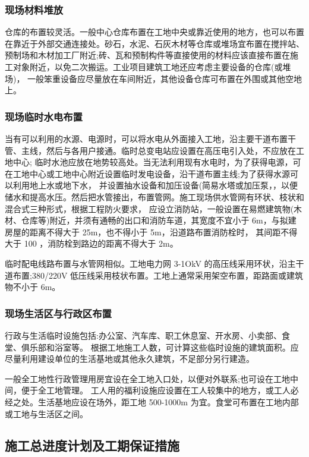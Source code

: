 \subsubsection{现场材料堆放}

仓库的布置较灵活。一般中心仓库布置在工地中央或靠近使用的地方，也可以布置在靠近于外部交通连接处。砂石，水泥、石灰木材等仓库或堆场宜布置在搅拌站、
预制场和木材加工厂附近;砖、瓦和预制构件等直接使用的材料应该直接布置在施工对象附近，以免二次搬运。工业项目建筑工地还应考虑主要设备的仓库(或堆场)，
一般笨重设备应尽量放在车间附近，其他设备仓库可布置在外围或其他空地上。

\subsubsection{现场临时水电布置}

当有可以利用的水源、电源时，可以将水电从外面接入工地，沿主要干道布置干管、主线，然后与各用户接通。临时总变电站应设置在高压电引入处，不应放在工地中心;
临时水池应放在地势较高处。当无法利用现有水电时，为了获得电源，可在工地中心或工地中心附近设置临时发电设备，沿干道布置主线;为了获得水源可以利用地上水或地下水，
并设置抽水设备和加压设备(简易水塔或加压泵，，以便储水和提高水压。然后把水管接出，布置管网。施工现场供水管网有环状、枝状和混合式三种形式，根据工程防火要求，
应设立消防站，一般设置在易燃建筑物(木材、仓库等)附近，并须有通畅的出口和消防车道，其宽度不宜小于 6m，与拟建房屋的距离不得大于 25m，也不得小于 5m，沿道路布置消防栓时，
其间距不得大于 100 ，消防栓到路边的距离不得大于 2m。

临时配电线路布置与水管网相似。工地电力网 3-1OkV 的高压线采用环状，沿主干道布置;380/220V 低压线采用枝状布置。工地上通常采用架空布置，距路面或建筑物不小于 6m。

\subsubsection{现场生活区与行政区布置}

行政与生活临时设施包括:办公室、汽车库、职工休息室、开水房、小卖部、食堂、俱乐部和浴室等。
根据工地施工人数，可计算这些临时设施的建筑面积。应尽量利用建设单位的生活基地或其他永久建筑，不足部分另行建造。

一般全工地性行政管理用房宜设在全工地入口处，以便对外联系;也可设在工地中间，便于全工地管理。
工人用的福利设施应设置在工人较集中的地方，或工人必经之处。生活基地应设在场外，距工地 500-1000m 为宜。食堂可布置在工地内部或工地与生活区之间。

\subsection{施工总进度计划及工期保证措施}
